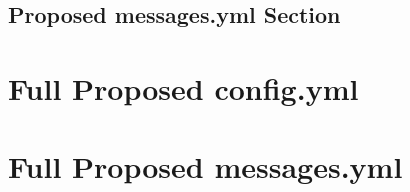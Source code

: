 \documentclass[letterpaper,12pt]{article}
\begin{document}
  \clearpage
  \subsection{Proposed messages.yml Section}
  

  \clearpage
  \appendix
  \section{Full Proposed config.yml}
  
  
  
  

  \clearpage
  \section{Full Proposed messages.yml}
  
  
\end{document}
